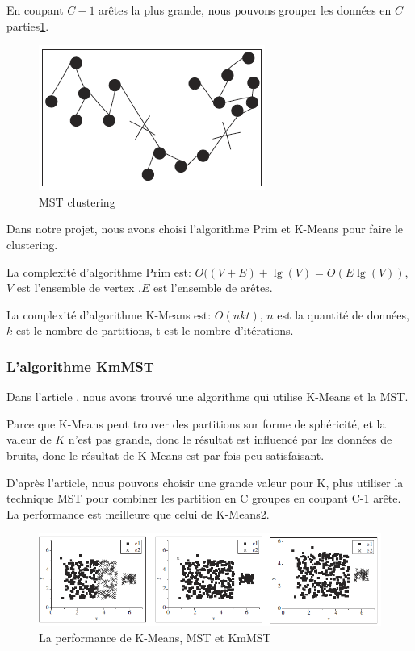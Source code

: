 En coupant $C-1$ arêtes la plus grande, nous pouvons grouper les données en $C$ parties\ref{fig:mstc}.
\begin{figure}[H]
\centering
\includegraphics[width=0.4\linewidth]{images/mstc}
\caption{MST clustering}
\label{fig:mstc}
\end{figure}

Dans notre projet, nous avons choisi l'algorithme Prim et K-Means pour faire le clustering. 

La complexité d'algorithme Prim est: $O((V+E)+\lg (V) = O(E \lg (V)) $, $V$ est l'ensemble de vertex ,$E$ est l'ensemble de arêtes.

La complexité d'algorithme K-Means est: $O(nkt)$, $n$ est la quantité de données, $k$ est le nombre de partitions, t est le nombre d'itérations.
\subsubsection{L'algorithme KmMST}

Dans l'article \cite{KmMst}, nous avons trouvé une algorithme qui utilise K-Means et la MST. 

Parce que K-Means peut trouver des partitions sur forme de sphéricité, et la valeur de $K$ n'est pas grande, donc le résultat est influencé par les données de bruits, donc le résultat de K-Means est par fois peu satisfaisant. 

D'après l'article, nous pouvons choisir une grande valeur pour K, plus utiliser la technique MST pour combiner les partition en C groupes en coupant C-1 arête. La performance est meilleure que celui de K-Means\ref{fig:kmmst}.
\begin{figure}[H]
\centering
\includegraphics[width=1.0\linewidth]{images/kmmst}
\caption{La performance de K-Means, MST et KmMST}
\label{fig:kmmst}
\end{figure}


